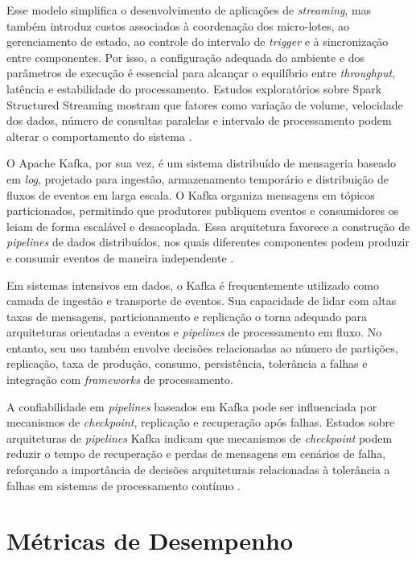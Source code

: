 Esse modelo simplifica o desenvolvimento de aplicações de \textit{streaming}, mas também introduz custos associados à coordenação dos micro-lotes, ao gerenciamento de estado, ao controle do intervalo de \textit{trigger} e à sincronização entre componentes. Por isso, a configuração adequada do ambiente e dos parâmetros de execução é essencial para alcançar o equilíbrio entre \textit{throughput}, latência e estabilidade do processamento. Estudos exploratórios sobre Spark Structured Streaming mostram que fatores como variação de volume, velocidade dos dados, número de consultas paralelas e intervalo de processamento podem alterar o comportamento do sistema \cite{ivanov2018exploratory}.

O Apache Kafka, por sua vez, é um sistema distribuído de mensageria baseado em \textit{log}, projetado para ingestão, armazenamento temporário e distribuição de fluxos de eventos em larga escala. O Kafka organiza mensagens em tópicos particionados, permitindo que produtores publiquem eventos e consumidores os leiam de forma escalável e desacoplada. Essa arquitetura favorece a construção de \textit{pipelines} de dados distribuídos, nos quais diferentes componentes podem produzir e consumir eventos de maneira independente \cite{kreps2011kafka}.

Em sistemas intensivos em dados, o Kafka é frequentemente utilizado como camada de ingestão e transporte de eventos. Sua capacidade de lidar com altas taxas de mensagens, particionamento e replicação o torna adequado para arquiteturas orientadas a eventos e \textit{pipelines} de processamento em fluxo. No entanto, seu uso também envolve decisões relacionadas ao número de partições, replicação, taxa de produção, consumo, persistência, tolerância a falhas e integração com \textit{frameworks} de processamento.

A confiabilidade em \textit{pipelines} baseados em Kafka pode ser influenciada por mecanismos de \textit{checkpoint}, replicação e recuperação após falhas. Estudos sobre arquiteturas de \textit{pipelines} Kafka indicam que mecanismos de \textit{checkpoint} podem reduzir o tempo de recuperação e perdas de mensagens em cenários de falha, reforçando a importância de decisões arquiteturais relacionadas à tolerância a falhas em sistemas de processamento contínuo \cite{aung2019coordinate}.

\section{Métricas de Desempenho}
\label{sec:metricas-desempenho}

